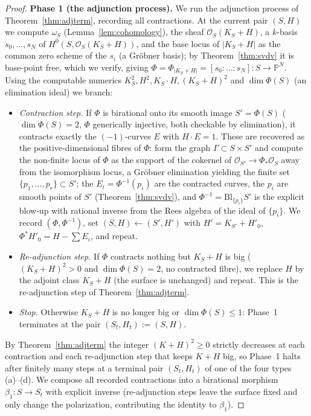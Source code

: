 \documentclass{amsart}
\theoremstyle{plain}
\theoremstyle{definition}
\newcommand{\PP}{\mathbb{P}}
\newcommand{\cO}{\mathcal{O}}
\begin{document}
\begin{proof}
\medskip\noindent\textbf{Phase 1 (the adjunction process).}
We run the adjunction process of Theorem~\ref{thm:adjterm}, recording all
contractions.  At the current pair $(S,H)$ we compute $\omega_S$
(Lemma~\ref{lem:cohomology}), the sheaf $\cO_S(K_S+H)$, a $k$-basis
$s_0,\dots,s_N$ of $H^0(S,\cO_S(K_S+H))$, and the base locus of $|K_S+H|$ as the
common zero scheme of the $s_i$ (a Gr\"obner basis); by
Theorem~\ref{thm:svdv} it is base-point free, which we verify, giving
$\Phi=\Phi_{|K_S+H|}=[s_0:\dots:s_N]\colon S\to\PP^N$.  Using the computable
numerics $K_S^2,H^2,K_S\cdot H,(K_S+H)^2$ and $\dim\Phi(S)$ (an elimination
ideal) we branch:
\begin{itemize}
\item \emph{Contraction step.}  If $\Phi$ is birational onto its smooth image
$S'=\Phi(S)$ ($\dim\Phi(S)=2$, $\Phi$ generically injective, both checkable by
elimination), it contracts exactly the $(-1)$-curves $E$ with $H\cdot E=1$.
These are recovered as the positive-dimensional fibres of $\Phi$: form the graph
$\Gamma\subset S\times S'$ and compute the non-finite locus of $\Phi$ as the
support of the cokernel of $\cO_{S'}\to\Phi_*\cO_S$ away from the isomorphism
locus, a Gr\"obner elimination yielding the finite set
$\{p_1,\dots,p_r\}\subset S'$; the $E_i=\Phi^{-1}(p_i)$ are the contracted
curves, the $p_i$ are smooth points of $S'$ (Theorem~\ref{thm:svdv}), and
$\Phi^{-1}=\mathrm{Bl}_{\{p_i\}}S'$ is the explicit blow-up with rational inverse
from the Rees algebra of the ideal of $\{p_i\}$.  We record $(\Phi,\Phi^{-1})$,
set $(S,H)\leftarrow(S',H')$ with $H'=K_{S'}+H'_0$, $\Phi^*H'_0=H-\sum E_i$, and
repeat.
\item \emph{Re-adjunction step.}  If $\Phi$ contracts nothing but $K_S+H$ is big
($(K_S+H)^2>0$ and $\dim\Phi(S)=2$, no contracted fibre), we replace $H$ by the
adjoint class $K_S+H$ (the surface is unchanged) and repeat.  This is the
re-adjunction step of Theorem~\ref{thm:adjterm}.
\item \emph{Stop.}  Otherwise $K_S+H$ is no longer big or $\dim\Phi(S)\le1$:
Phase~1 terminates at the pair $(S_t,H_t):=(S,H)$.
\end{itemize}
By Theorem~\ref{thm:adjterm} the integer $(K+H)^2\ge0$ strictly decreases at each
contraction and each re-adjunction step that keeps $K+H$ big, so Phase~1 halts
after finitely many steps at a terminal pair $(S_t,H_t)$ of one of the four types
(a)--(d).  We compose all recorded contractions into a birational morphism
$\beta_1\colon S\to S_t$ with explicit inverse (re-adjunction steps leave the
surface fixed and only change the polarization, contributing the identity to
$\beta_1$).


\end{proof}
\end{document}
